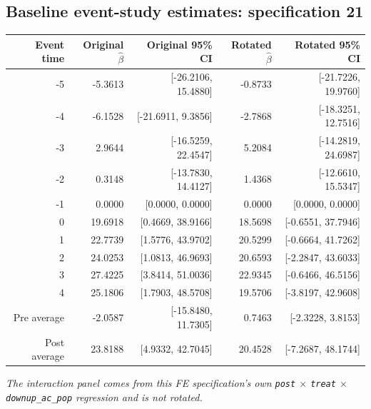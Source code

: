 \documentclass[10pt]{article}
\begin{document}
\subsection*{Baseline event-study estimates: specification 21}
\begin{center}
\scriptsize
\begin{tabular}{r rr rr}
\toprule
Event time & Original $\hat\beta$ & Original 95\% CI & Rotated $\hat\beta$ & Rotated 95\% CI \\
\midrule
-5 & -5.3613 & [-26.2106, 15.4880] & -0.8733 & [-21.7226, 19.9760] \\
-4 & -6.1528 & [-21.6911, 9.3856] & -2.7868 & [-18.3251, 12.7516] \\
-3 & 2.9644 & [-16.5259, 22.4547] & 5.2084 & [-14.2819, 24.6987] \\
-2 & 0.3148 & [-13.7830, 14.4127] & 1.4368 & [-12.6610, 15.5347] \\
-1 & 0.0000 & [0.0000, 0.0000] & 0.0000 & [0.0000, 0.0000] \\
0 & 19.6918 & [0.4669, 38.9166] & 18.5698 & [-0.6551, 37.7946] \\
1 & 22.7739 & [1.5776, 43.9702] & 20.5299 & [-0.6664, 41.7262] \\
2 & 24.0253 & [1.0813, 46.9693] & 20.6593 & [-2.2847, 43.6033] \\
3 & 27.4225 & [3.8414, 51.0036] & 22.9345 & [-0.6466, 46.5156] \\
4 & 25.1806 & [1.7903, 48.5708] & 19.5706 & [-3.8197, 42.9608] \\
\midrule
Pre average & -2.0587 & [-15.8480, 11.7305] & 0.7463 & [-2.3228, 3.8153] \\
Post average & 23.8188 & [4.9332, 42.7045] & 20.4528 & [-7.2687, 48.1744] \\
\bottomrule
\end{tabular}
\end{center}
\medskip
\textit{The interaction panel comes from this FE specification's own \texttt{post} $\times$ \texttt{treat} $\times$ \texttt{downup\_ac\_pop} regression and is not rotated.}
\clearpage
\end{document}
